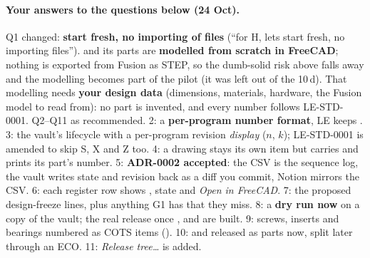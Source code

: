 \paragraph{Your answers to the questions below (24 Oct).} Q1 changed: \textbf{start fresh, no importing of files}
(``for H, lets start fresh, no importing files'').  and its parts are \textbf{modelled from scratch in
FreeCAD}; nothing is exported from Fusion as STEP, so the dumb-solid risk above falls away and the modelling becomes
part of the pilot (it was left out of the 10\,d). That modelling needs \textbf{your design data} (dimensions, materials,
hardware, the Fusion model to read from): no part is invented, and every number follows LE-STD-0001. Q2--Q11 as
recommended. 2: a \textbf{per-program number format}, LE keeps . 3: the vault's lifecycle with a
per-program revision \emph{display} ($n$, $k$); LE-STD-0001 is amended to skip S, X and Z too. 4: a
drawing stays its own item but carries and prints its part's number. 5: \textbf{ADR-0002 accepted}: the CSV is the
sequence log, the vault writes state and revision back as a diff you commit, Notion mirrors the CSV. 6: each register
row shows , state and \emph{Open in FreeCAD}. 7: the proposed design-freeze lines, plus anything G1 has
that they miss. 8: a \textbf{dry run now} on a copy of the vault; the real release once , 
and  are built. 9: screws, inserts and bearings numbered as COTS items (). 10: 
and  released as parts now, split later through an ECO. 11: \emph{Release tree\ldots} is added.

